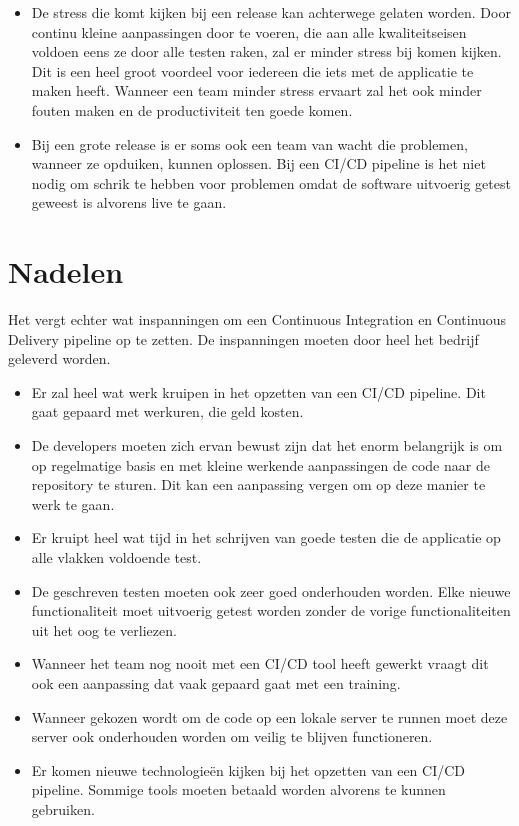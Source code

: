 \begin{itemize}
        \item De stress die komt kijken bij een release kan achterwege gelaten worden. Door continu kleine aanpassingen door te voeren, die aan alle kwaliteitseisen voldoen eens ze door alle testen raken, zal er minder stress bij komen kijken. Dit is een heel groot voordeel voor iedereen die iets met de applicatie te maken heeft. Wanneer een team minder stress ervaart zal het ook minder fouten maken en de productiviteit ten goede komen.
        \item Bij een grote release is er soms ook een team van wacht die problemen, wanneer ze opduiken, kunnen oplossen. Bij een CI/CD pipeline is het niet nodig om schrik te hebben voor problemen omdat de software uitvoerig getest geweest is alvorens live te gaan.
    \end{itemize}
    
    \section{Nadelen}
    Het vergt echter wat inspanningen om een Continuous Integration en Continuous Delivery pipeline op te zetten. De inspanningen moeten door heel het bedrijf geleverd worden.
    \begin{itemize}
        \item Er zal heel wat werk kruipen in het opzetten van een CI/CD pipeline. Dit gaat gepaard met werkuren, die geld kosten.
        \item De developers moeten zich ervan bewust zijn dat het enorm belangrijk is om op regelmatige basis en met kleine werkende aanpassingen de code naar de repository te sturen. Dit kan een aanpassing vergen om op deze manier te werk te gaan.
        \item Er kruipt heel wat tijd in het schrijven van goede testen die de applicatie op alle vlakken voldoende test.
        \item De geschreven testen moeten ook zeer goed onderhouden worden. Elke nieuwe functionaliteit moet uitvoerig getest worden zonder de vorige functionaliteiten uit het oog te verliezen.
        \item Wanneer het team nog nooit met een CI/CD tool heeft gewerkt vraagt dit ook een aanpassing dat vaak gepaard gaat met een training.
        \item Wanneer gekozen wordt om de code op een lokale server te runnen moet deze server ook onderhouden worden om veilig te blijven functioneren.
        \item Er komen nieuwe technologieën kijken bij het opzetten van een CI/CD pipeline. Sommige tools moeten betaald worden alvorens te kunnen gebruiken. 
    \end{itemize}